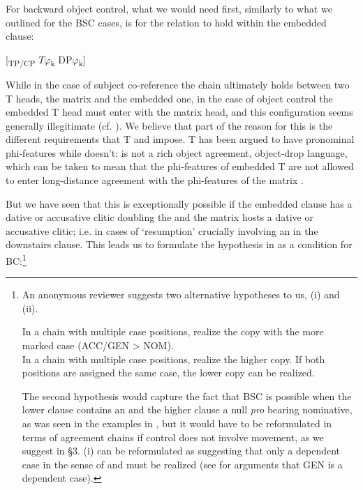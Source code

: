 \documentclass[output=paper]{langsci/langscibook}
\begin{document}
For backward object control, what we would need first, similarly to what we outlined for the BSC cases, is for the  relation to hold within the embedded clause:

\ea%
    \label{ex:alexiadou:54}
    \textsubscript{} [\textsubscript{TP/CP}    $T\varphi $\textsubscript{k}    DP$\varphi $\textsubscript{k}]  
\z
 
While in the case of subject co-reference the  chain ultimately holds between two T heads, the matrix and the embedded one, in the case of object control the embedded T head must enter  with the matrix  head, and this configuration seems generally illegitimate (cf. \citealt{Kayne1989}). We believe that part of the reason for this is the different requirements that T and  impose. T has been argued to have pronominal phi-features while  doesn’t:  is not a rich object agreement, object-drop language, which can be taken to mean that the phi-features of embedded T are not allowed to enter long-distance agreement with the phi-features of the matrix . 

But we have seen that this is exceptionally possible if the embedded clause has a dative or accusative clitic doubling the  and the matrix  hosts a dative or accusative clitic; i.e. in cases of ‘resumption’ crucially involving an  in the downstairs clause. This leads us to formulate the hypothesis in  as a condition for BC:\footnote{An anonymous reviewer suggests two alternative hypotheses to us, (i) and (ii).

\ea \glt In a chain with multiple case positions, realize the copy with the more marked case (ACC\slash GEN > NOM).\\
\z
\ea \glt In a chain with multiple case positions, realize the higher copy. If both positions are assigned the same case, the lower copy can be realized.\\
\z    

The second hypothesis would capture the fact that BSC is possible when the lower clause contains an  and the higher clause a null \textit{pro} bearing nominative, as was seen in the examples in , but it would have to be reformulated in terms of agreement chains if control does not involve movement, as we suggest in §3. (i) can be reformulated as suggesting that only a dependent case in the sense of \citet{Marantz1991} and \citet{Baker2015} must be realized (see \citealt{Anagnostopoulou2017} for arguments that  GEN is a dependent case).}
\end{document}
